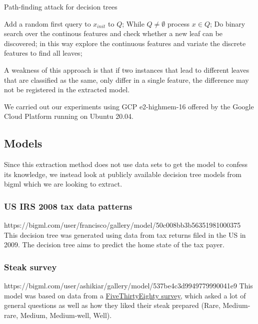\documentclass[a4paper,11pt]{article}
\begin{document}
    \begin{algorithm}
        \caption{Path-finding attack for decision trees}
	    \begin{algorithmic}[1]
		    \State Add a random first query to $x_{init}$ to $Q$;
		    \State While $Q\neq\emptyset$ process $x\in Q$;
		    \State Do binary search over the continous features and check whether a new leaf can be discovered;
		    \State in this way explore the continuous features and variate the discrete features to find all leaves;
	    \end{algorithmic}
	    \label{alg:DT-attack}
    \end{algorithm}
    A weakness of this approach is that if two instances that lead to different leaves that are classified as the same, only differ in a single feature, the difference may not be registered in the extracted model.
    
    We carried out our experiments using GCP e2-highmem-16 offered by the Google Cloud Platform running on Ubuntu 20.04.
    
    \subsection{Models}
        Since this extraction method does not use data sets to get the model to confess its knowledge, we instead look at publicly available decision tree models from bigml which we are looking to extract.
        \subsubsection{US IRS 2008 tax data patterns}
        https://bigml.com/user/francisco/gallery/model/50c008bb3b56351981000375
        This decision tree was generated using data from tax returns filed in the US in 2009. The decision tree aims to predict the home state of the tax payer.
        \subsubsection{Steak survey}
        https://bigml.com/user/ashikiar/gallery/model/537be4c3d9949779990041e9
        This model was based on data from a \hyperlink{https://fivethirtyeight.com/features/how-americans-like-their-steak/}{FiveThirtyEighty survey}, which asked a lot of general questions as well as how they liked their steak prepared (Rare, Medium-rare, Medium, Medium-well, Well). 
\end{document}
